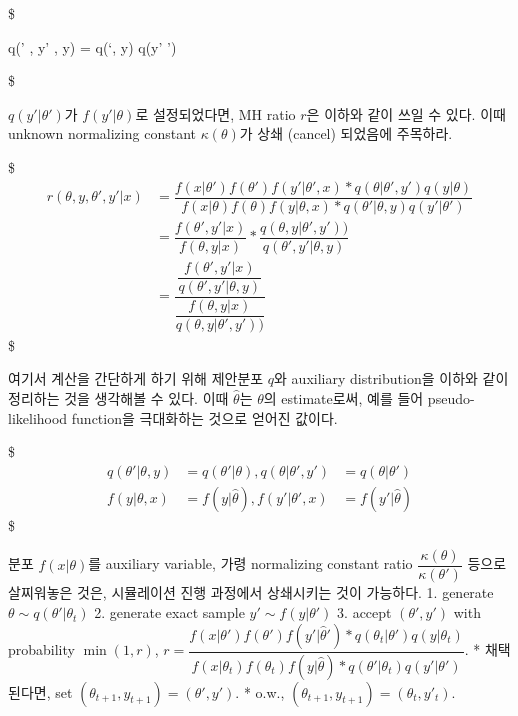 \documentclass[
]{book}
\begin{document}
\$

q(\theta' , y' \vert \theta , y) = q(\theta`\vert \theta , y) \ast q(y' \vert \theta')

\$

\(q(y' \vert \theta ' )\)가 \(f(y' \vert \theta)\)로 설정되었다면, MH ratio \(r\)은 이하와 같이 쓰일 수 있다. 이때 unknown normalizing constant \(\kappa(\theta)\)가 상쇄 (cancel) 되었음에 주목하라.

\$
\begin{align*}

r(\theta, y, \theta', y' \vert x)

&= 


\dfrac 
{f(x \vert \theta') f(\theta') f(y' \vert \theta' , x) \ast q(\theta\vert \theta' , y') q(y \vert \theta)} 
{f(x \vert \theta) f(\theta) f(y \vert \theta , x) \ast q(\theta'\vert \theta , y) q(y' \vert \theta')}

 \\

&= 

\dfrac {f(\theta', y' \vert x)}{f(\theta, y \vert x)} \ast 
\dfrac {q(\theta , y \vert \theta' , y'))}{q(\theta' , y' \vert \theta , y)}


 \\
&=

\dfrac
{
\dfrac {f(\theta', y' \vert x)}{q(\theta' , y' \vert \theta , y)} 
}
{
\dfrac{f(\theta, y \vert x) }{q(\theta , y \vert \theta' , y'))}
}



\end{align*}
\$

여기서 계산을 간단하게 하기 위해 제안분포 \(q\)와 auxiliary distribution을 이하와 같이 정리하는 것을 생각해볼 수 있다. 이때 \(\hat \theta\)는 \(\theta\)의 estimate로써, 예를 들어 pseudo-likelihood function을 극대화하는 것으로 얻어진 값이다.

\$
\begin{align*}

q(\theta' \vert \theta , y) &= q(\theta' \vert \theta ) , q(\theta \vert \theta ', y') &= q(\theta \vert \theta ') \\

f(y \vert \theta , x) &= f(y \vert \hat \theta ), f(y' \vert \theta' , x) &= f(y' \vert \hat \theta )

\end{align*}
\$

분포 \(f(x \vert \theta)\)를 auxiliary variable, 가령 normalizing constant ratio \(\dfrac {\kappa(\theta)} {\kappa(\theta')}\) 등으로 살찌워놓은 것은, 시뮬레이션 진행 과정에서 상쇄시키는 것이 가능하다.
1. generate \(\theta \sim q(\theta' \vert \theta_t)\)
2. generate exact sample \(y' \sim f(y \vert \theta')\)
3. accept \((\theta', y')\) with probability \(\min (1, r)\), \(r=\dfrac {f(x \vert \theta') f(\theta') f(y' \vert \hat \theta') \ast q(\theta_t \vert \theta') q(y \vert \theta_t)} {f(x \vert \theta_t) f(\theta_t) f(y \vert \hat \theta) \ast q(\theta'\vert \theta_t) q(y' \vert \theta')}\).
* 채택된다면, set \((\theta_{t+1}, y_{t+1}) = (\theta', y' )\).
* o.w., \((\theta_{t+1}, y_{t+1}) = (\theta_t, y'_t)\).
\end{document}
